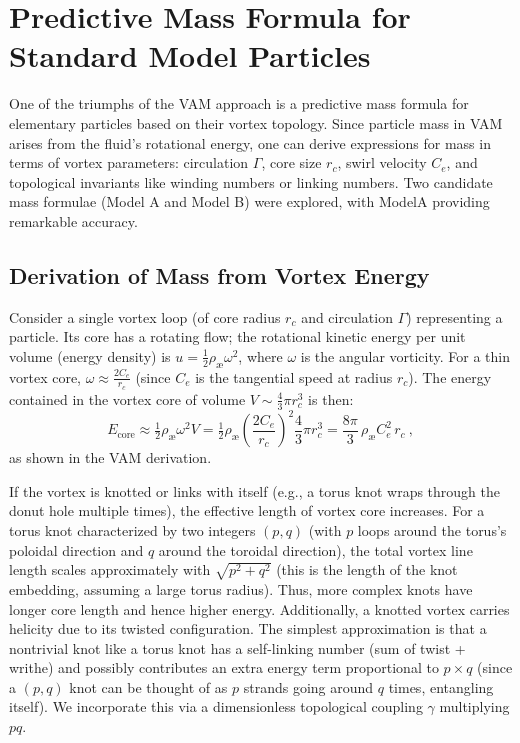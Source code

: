 \section{Predictive Mass Formula for Standard Model Particles}

One of the triumphs of the VAM approach is a predictive mass formula for elementary particles based on their vortex topology. Since particle mass in VAM arises from the fluid's rotational energy, one can derive expressions for mass in terms of vortex parameters: circulation $\Gamma$, core size $r_c$, swirl velocity $C_e$, and topological invariants like winding numbers or linking numbers. Two candidate mass formulae (Model A and Model B) were explored, with ModelA providing remarkable accuracy.

\subsection{Derivation of Mass from Vortex Energy}

Consider a single vortex loop (of core radius $r_c$ and circulation $\Gamma$) representing a particle. Its core has a rotating flow; the rotational kinetic energy per unit volume (energy density) is $u = \tfrac{1}{2}\rho_{\text{\ae}}\omega^2$, where $\omega$ is the angular vorticity. For a thin vortex core, $\omega \approx \frac{2 C_e}{r_c}$ (since $C_e$ is the tangential speed at radius $r_c$). The energy contained in the vortex core of volume $V \sim \frac{4}{3}\pi r_c^3$ is then:
\[
    E_{\text{core}} \approx \tfrac{1}{2}\rho_{\text{\ae}}\omega^2 V = \tfrac{1}{2}\rho_{\text{\ae}}\left(\frac{2C_e}{r_c}\right)^2 \frac{4}{3}\pi r_c^3 = \frac{8\pi}{3}\,\rho_{\text{\ae}} C_e^2\, r_c~,
\]
as shown in the VAM derivation.

If the vortex is knotted or links with itself (e.g., a torus knot wraps through the donut hole multiple times), the effective length of vortex core increases. For a torus knot characterized by two integers $(p, q)$ (with $p$ loops around the torus's poloidal direction and $q$ around the toroidal direction), the total vortex line length scales approximately with $\sqrt{p^2+q^2}$ (this is the length of the knot embedding, assuming a large torus radius). Thus, more complex knots have longer core length and hence higher energy. Additionally, a knotted vortex carries helicity due to its twisted configuration. The simplest approximation is that a nontrivial knot like a torus knot has a self-linking number (sum of twist + writhe) and possibly contributes an extra energy term proportional to $p \times q$ (since a $(p,q)$ knot can be thought of as $p$ strands going around $q$ times, entangling itself). We incorporate this via a dimensionless topological coupling $\gamma$ multiplying $p q$.

